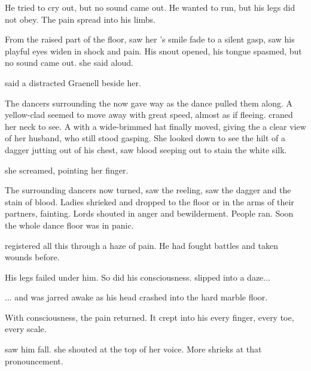  He tried to cry out, but no sound came out. He wanted to run, but his legs did not obey. The pain spread into his limbs. 

From the raised part of the floor, \Tiroco{} saw her \rayuth's smile fade to a silent gasp, saw his playful eyes widen in shock and pain. His snout opened, his tongue spasmed, but no sound came out.  she said aloud. 

 said a distracted Graenell beside her. 

The dancers surrounding the \rayuth now gave way as the dance pulled them along. A yellow-clad \human{} seemed to move away with great speed, almost as if fleeing. \Tiroco{} craned her neck to see. A \sphyle{} with a wide-brimmed hat finally moved, giving the \rinyuth a clear view of her husband, who still stood gasping. She looked down to see the hilt of a dagger jutting out of his chest, saw blood seeping out to stain the white silk. 

 she screamed, pointing her finger. 

The surrounding dancers now turned, saw the \rayuth reeling, saw the dagger and the stain of blood. Ladies shrieked and dropped to the floor or in the arms of their partners, fainting. Lords shouted in anger and bewilderment. People ran. Soon the whole dance floor was in panic. 


\Icor{} registered all this through a haze of pain. 
He had fought battles and taken wounds before. 

His legs failed under him. So did his consciousness. \Icor{} slipped into a daze...

... and was jarred awake as his head crashed into the hard marble floor. 

With consciousness, the pain returned. It crept into his every finger, every toe, every scale. 

\Tiroco{} saw him fall. 
 she shouted at the top of her voice. 
More shrieks at that pronouncement. 

